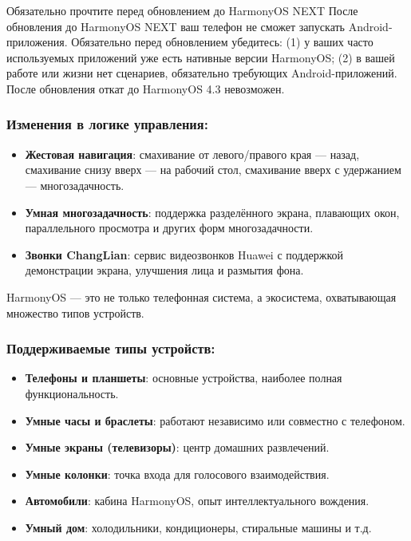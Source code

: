 \begin{tcbwarn}{Обязательно прочтите перед обновлением до HarmonyOS NEXT}
После обновления до HarmonyOS NEXT ваш телефон не сможет запускать Android-приложения. Обязательно перед обновлением убедитесь: (1) у ваших часто используемых приложений уже есть нативные версии HarmonyOS; (2) в вашей работе или жизни нет сценариев, обязательно требующих Android-приложений. После обновления откат до HarmonyOS 4.3 невозможен.

\end{tcbwarn}

\subsubsection*{Изменения в логике управления:}

\begin{itemize}
  \item \textbf{Жестовая навигация}: смахивание от левого/правого края — назад, смахивание снизу вверх — на рабочий стол, смахивание вверх с удержанием — многозадачность.
  \item \textbf{Умная многозадачность}: поддержка разделённого экрана, плавающих окон, параллельного просмотра и других форм многозадачности.
  \item \textbf{Звонки ChangLian}: сервис видеозвонков Huawei с поддержкой демонстрации экрана, улучшения лица и размытия фона.
\end{itemize}


HarmonyOS — это не только телефонная система, а экосистема, охватывающая множество типов устройств.

\subsubsection*{Поддерживаемые типы устройств:}

\begin{itemize}
  \item \textbf{Телефоны и планшеты}: основные устройства, наиболее полная функциональность.
  \item \textbf{Умные часы и браслеты}: работают независимо или совместно с телефоном.
  \item \textbf{Умные экраны (телевизоры)}: центр домашних развлечений.
  \item \textbf{Умные колонки}: точка входа для голосового взаимодействия.
  \item \textbf{Автомобили}: кабина HarmonyOS, опыт интеллектуального вождения.
  \item \textbf{Умный дом}: холодильники, кондиционеры, стиральные машины и т.д.
\end{itemize}

